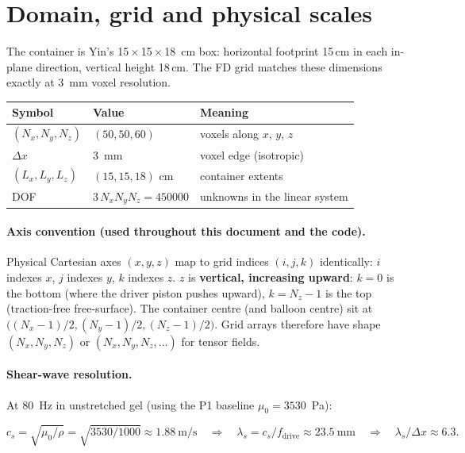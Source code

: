 \documentclass[11pt,letterpaper]{article}
\begin{document}
\section{Domain, grid and physical scales}
\label{sec:domain}

The container is Yin's \SI{15}{}\,$\times$\,\SI{15}{}\,$\times$\,\SI{18}{\centi\metre}
box: horizontal footprint 15\,\si{\centi\metre} in each in-plane direction,
vertical height 18\,\si{\centi\metre}. The FD grid matches these dimensions
exactly at \SI{3}{\milli\metre} voxel resolution.

\begin{center}
\begin{tabular}{lll}
\toprule
Symbol & Value & Meaning \\
\midrule
$(N_x, N_y, N_z)$ & $(50, 50, 60)$ & voxels along $x$, $y$, $z$ \\
$\Delta x$        & \SI{3}{\milli\metre} & voxel edge (isotropic) \\
$(L_x, L_y, L_z)$ & $(15, 15, 18)$ \si{\centi\metre} & container extents \\
DOF               & $3\,N_x N_y N_z = \num{450000}$ & unknowns in the linear system \\
\bottomrule
\end{tabular}
\end{center}

\paragraph{Axis convention (used throughout this document and the code).}
\label{par:axes}
Physical Cartesian axes $(x, y, z)$ map to grid indices $(i, j, k)$
identically: $i$ indexes $x$, $j$ indexes $y$, $k$ indexes $z$.
$z$ is \textbf{vertical, increasing upward}: $k=0$ is the bottom
(where the driver piston pushes upward), $k=N_z-1$ is the top
(traction-free free-surface). The container centre (and balloon
centre) sit at $\bigl((N_x-1)/2, (N_y-1)/2, (N_z-1)/2\bigr)$.
Grid arrays therefore have shape $(N_x, N_y, N_z)$ or
$(N_x, N_y, N_z, \ldots)$ for tensor fields.

\paragraph{Shear-wave resolution.} At \SI{80}{\hertz} in unstretched gel
(using the P1 baseline $\mu_0 = 3530$~Pa):

\begin{equation}
c_s = \sqrt{\mu_0/\rho} = \sqrt{3530 / 1000} \approx \SI{1.88}{\metre\per\second}
\quad\Rightarrow\quad
\lambda_s = c_s / f_{\text{drive}} \approx \SI{23.5}{\milli\metre}
\quad\Rightarrow\quad
\lambda_s / \Delta x \approx 6.3.
\end{equation}
\end{document}
